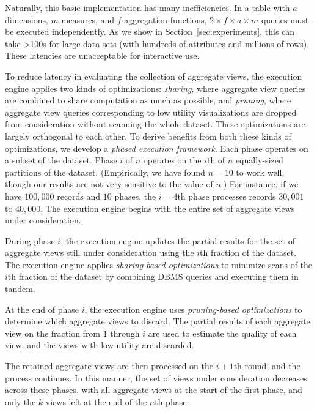 Naturally, this basic implementation has many inefficiencies.
In a table with $a$ dimensions, $m$ measures, and $f$ aggregation functions, 
$2\times f \times a \times  m$ queries must be executed independently.  
As we show in Section~\ref{sec:experiments}, this can take >100s for
large data sets (with hundreds of attributes and millions of rows).
These latencies are unacceptable for interactive use.

To reduce latency in 
evaluating the collection of aggregate views, 
the execution engine  
applies two kinds of optimizations:
{\em sharing}, where aggregate view queries are combined to share computation
as much as possible, and {\em pruning}, where aggregate view queries
corresponding to low utility visualizations are dropped from consideration without scanning the whole
dataset.
These optimizations are largely orthogonal to each other.
To derive benefits from both these kinds of optimizations,
we develop a {\em phased execution framework}.
Each phase operates on a subset of the dataset.
Phase $i$ of $n$ operates on the $i$th of $n$ equally-sized partitions of the dataset. 
(Empirically, we have found $n=10$ to
work well, though our results are not very sensitive to the value
of $n$.) 
For instance, if we have $100,000$ records and $10$ phases,
the $i = 4$th phase processes records $30,001$ to $40,000$.
The execution engine begins 
with the entire set of aggregate views under consideration.
\begin{denselist}
\item During phase $i$, the execution engine updates the partial results
for the set of aggregate views
still under consideration using the $i$th fraction of the dataset.
The execution engine applies {\em sharing-based optimizations}
to minimize scans of the $i$th fraction of the dataset by combining
DBMS queries and executing them in tandem.
\item At the end of phase $i$, the execution engine uses 
{\em pruning-based optimizations} to determine which aggregate views to discard.
The partial results of each aggregate view on the fraction from $1$ through $i$ are used to 
estimate the quality of each view, and the views with low utility are discarded. 
\end{denselist}
The retained aggregate views are then processed on the $i+1$th round,
and the process continues. 
In this manner, the set of views under consideration
decreases across these phases, with all aggregate views at the start 
of the first phase, and only the $k$ views left
at the end of the $n$th phase.


